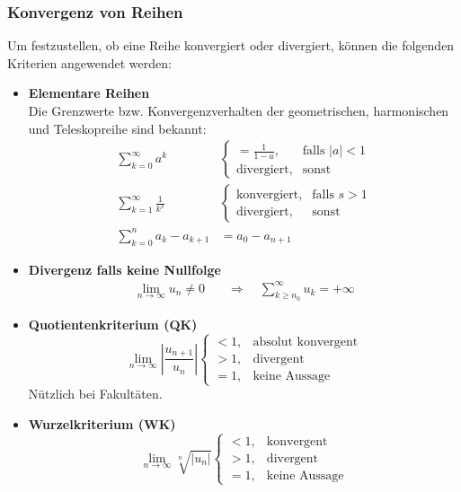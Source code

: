 \documentclass{article}
\begin{document}
\subsubsection{Konvergenz von Reihen}
Um festzustellen, ob eine Reihe konvergiert oder divergiert, können die folgenden Kriterien angewendet werden:
\begin{itemize}
	\item \textbf{Elementare Reihen}\\
	Die Grenzwerte bzw. Konvergenzverhalten der geometrischen, harmonischen und Teleskopreihe sind bekannt:
	\begin{align}
		\sum_{k=0}^\infty a^k & 
		\begin{cases} 
			= \frac{1}{1 - a}, & \text{falls $|a| < 1$}\\
			\text{divergiert}, & \text{sonst}
		\end{cases}\\
		\sum_{k=1}^\infty \frac{1}{k^s} & 
		\begin{cases}
			\text{konvergiert}, & \text{falls $s > 1$}\\ 
			\text{divergiert}, & \text{sonst}
		\end{cases}\\
		\sum_{k=0}^n a_k - a_{k+1} &= a_0 - a_{n+1}
	\end{align}


	\item \textbf{Divergenz falls keine Nullfolge}
		\begin{align}
			\lim\limits_{n\rightarrow\infty} u_n \neq 0 \quad&\Rightarrow\quad \sum_{k\geq n_0}^\infty u_k = +\infty
		\end{align}
	
	
	\item \textbf{Quotientenkriterium (QK)}
		\begin{equation}
			\lim\limits_{n\rightarrow\infty} \left|\frac{u_{n+1}}{u_n}\right|
			\begin{cases}
				< 1, & \text{absolut konvergent}\\
				> 1, & \text{divergent}\\
				= 1, & \text{keine Aussage}
			\end{cases}
		\end{equation}
	\textcolor{gruen}{Nützlich bei Fakultäten.}


	\item \textbf{Wurzelkriterium (WK)}
		\begin{equation}
			\lim\limits_{n\rightarrow\infty} \sqrt[n]{|u_n|}
			\begin{cases}
				< 1, & \text{konvergent}\\
				> 1, & \text{divergent}\\
				= 1, & \text{keine Aussage}
			\end{cases}	
		\end{equation}
		


\end{itemize}
\end{document}
